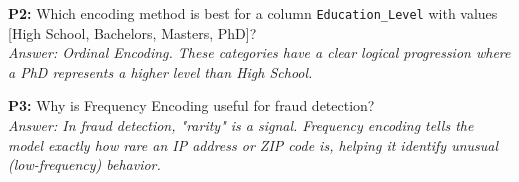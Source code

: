 \documentclass{article}
\begin{document}
\textbf{P2:} Which encoding method is best for a column \texttt{Education\_Level} with values [High School, Bachelors, Masters, PhD]? \\
\textit{Answer: Ordinal Encoding. These categories have a clear logical progression where a PhD represents a higher level than High School.}

\textbf{P3:} Why is Frequency Encoding useful for fraud detection? \\
\textit{Answer: In fraud detection, "rarity" is a signal. Frequency encoding tells the model exactly how rare an IP address or ZIP code is, helping it identify unusual (low-frequency) behavior.}
\end{document}
